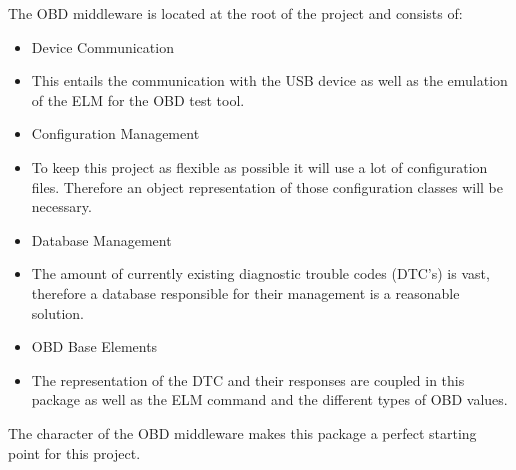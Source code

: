 {The OBD middleware is located at the root of the project and consists
of:}

\begin{itemize}
\tightlist
\item
  {Device Communication}
\end{itemize}

\begin{itemize}
\tightlist
\item
  {This entails the communication with the USB device as well as the
  emulation of the ELM for the OBD test tool.}
\end{itemize}

\begin{itemize}
\tightlist
\item
  {Configuration Management}
\end{itemize}

\begin{itemize}
\tightlist
\item
  {To keep this project as fl}{exible as possible it will use a lot of
  configuration files. Therefore an object representation of those
  configuration classes will be necessary.}
\end{itemize}

\begin{itemize}
\tightlist
\item
  {Database Management}
\end{itemize}

\begin{itemize}
\tightlist
\item
  {The amount of currently existing diagnostic trouble codes (DTC's) is
  vast, therefore a database responsible for their management is a
  reasonable solution.}
\end{itemize}

\begin{itemize}
\tightlist
\item
  {OBD Base Elements}
\end{itemize}

\begin{itemize}
\tightlist
\item
  {The representation of the DTC and their responses are coupled in this
  package as well as the ELM command and the different types of OBD
  values.}
\end{itemize}

{The character of the OBD middleware makes this package a perfect
starting point for this project. }

